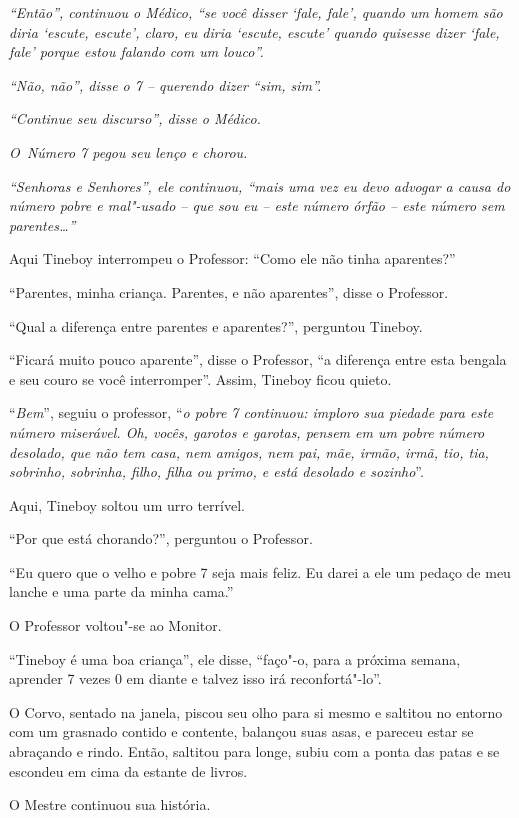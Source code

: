 \emph{``Então'', continuou o Médico, ``se você disser `fale, fale',
quando um homem são diria `escute, escute', claro, eu diria `escute,
escute' quando quisesse dizer `fale, fale' porque estou falando com um
louco''.}

\emph{``Não, não'', disse o 7 -- querendo dizer ``sim, sim''.}

\emph{``Continue seu discurso'', disse o Médico.}

\emph{O~Número 7 pegou seu lenço e chorou.}

\emph{``Senhoras e Senhores'', ele continuou, ``mais uma vez eu devo
advogar a causa do número pobre e mal"-usado -- que sou eu -- este número
órfão -- este número sem parentes…''}

Aqui Tineboy interrompeu o Professor: ``Como ele não tinha aparentes?''

``Parentes, minha criança. Parentes, e não aparentes'', disse o
Professor.

``Qual a diferença entre parentes e aparentes?'', perguntou Tineboy.

``Ficará muito pouco aparente'', disse o Professor, ``a diferença entre
esta bengala e seu couro se você interromper''. Assim, Tineboy ficou
quieto.

``\emph{Bem}'', seguiu o professor, ``\emph{o pobre 7 continuou: imploro
sua piedade para este número miserável. Oh, vocês, garotos e garotas,
pensem em um pobre número desolado, que não tem casa, nem amigos, nem
pai, mãe, irmão, irmã, tio, tia, sobrinho, sobrinha, filho, filha ou
primo, e está desolado e sozinho}''.

Aqui, Tineboy soltou um urro terrível.

``Por que está chorando?'', perguntou o Professor.

``Eu quero que o velho e pobre 7 seja mais feliz. Eu darei a ele um
pedaço de meu lanche e uma parte da minha cama.''

O Professor voltou"-se ao Monitor.

``Tineboy é uma boa criança'', ele disse, ``faço"-o, para a próxima
semana, aprender 7 vezes 0 em diante e talvez isso irá reconfortá"-lo''.

O Corvo, sentado na janela, piscou seu olho para si mesmo e saltitou no
entorno com um grasnado contido e contente, balançou suas asas, e
pareceu estar se abraçando e rindo. Então, saltitou para longe, subiu
com a ponta das patas e se escondeu em cima da estante de livros.

O Mestre continuou sua história.

